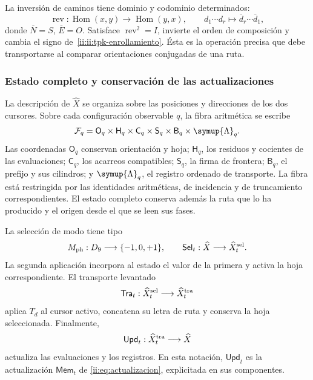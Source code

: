 La inversión de caminos tiene dominio y codominio determinados:
\[
 \operatorname{rev}:\operatorname{Hom}(x,y)
 \longrightarrow\operatorname{Hom}(y,x),\qquad
 d_1\cdots d_r\longmapsto\overline d_r\cdots\overline d_1,
\]
donde \(\overline N=S\), \(\overline E=O\). Satisface
\(\operatorname{rev}^2=I\), invierte el orden de composición y cambia el
signo de~\eqref{ii:ii:tpk-enrollamiento}. Ésta es la operación precisa que
debe transportarse al comparar orientaciones conjugadas de una ruta.

\subsubsection{Estado completo y conservación de las actualizaciones}

La descripción de \(\widehat X\) se organiza sobre las posiciones y
direcciones de los dos cursores. Sobre cada configuración observable
\(q\), la fibra aritmética se escribe
\begin{equation}
 \mathcal F_q=
 \mathsf O_q\times\mathsf H_q\times\mathsf C_q\times
 \mathsf S_q\times\mathsf B_q\times\symup{\Lambda}_q.
 \label{ii:ii:tpk-fibra}
\end{equation}
Las coordenadas \(\mathsf O_q\) conservan orientación y hoja;
\(\mathsf H_q\), los residuos y cocientes de las evaluaciones;
\(\mathsf C_q\), los acarreos compatibles;
\(\mathsf S_q\), la firma de frontera;
\(\mathsf B_q\), el prefijo y sus cilindros; y
\(\symup{\Lambda}_q\), el registro ordenado de transporte. La fibra está
restringida por las identidades aritméticas, de incidencia y de
truncamiento correspondientes. El estado completo conserva además la ruta
que lo ha producido y el origen desde el que se leen sus fases.

La selección de modo tiene tipo
\[
 M_{\rm ph}:D_9\longrightarrow\{-1,0,+1\},\qquad
 \mathsf{Sel}_t:\widehat X\longrightarrow\widehat X^{\rm sel}_t.
\]
La segunda aplicación incorpora al estado el valor de la primera y
activa la hoja correspondiente. El transporte levantado
\[
 \mathsf{Tra}_t:\widehat X^{\rm sel}_t
 \longrightarrow\widehat X^{\rm tra}_t
\]
aplica \(T_d\) al cursor activo, concatena su letra de ruta y conserva la
hoja seleccionada. Finalmente,
\[
 \mathsf{Upd}_t:\widehat X^{\rm tra}_t\longrightarrow\widehat X
\]
actualiza las evaluaciones y los registros. En esta notación,
\(\mathsf{Upd}_t\) es la actualización \(\mathsf{Mem}_t\) de
\eqref{ii:eq:actualizacion}, explicitada en sus componentes.

